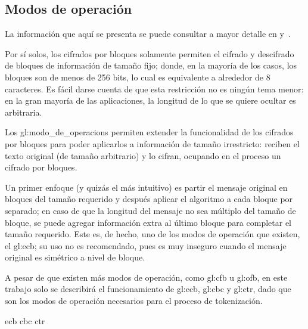 %
%

\subsection{Modos de operación}
\label{sec:modos}

La información que aquí se presenta se puede consultar a mayor detalle en
\cite{modos_de_operacion} y~\cite{menezes}.

Por sí solos, los cifrados por bloques solamente permiten el cifrado y
descifrado de bloques de información de tamaño fijo; donde, en la mayoría de
los casos, los bloques son de menos de 256 bits, lo cual es equivalente a
alrededor de 8 caracteres. Es fácil darse cuenta de que esta restricción no es
ningún tema menor: en la gran mayoría de las aplicaciones, la longitud de lo
que se quiere ocultar es arbitraria.

Los \glspl{gl:modo_de_operacion} permiten extender la funcionalidad de los
cifrados por bloques para poder aplicarlos a información de tamaño irrestricto:
reciben el texto original (de tamaño arbitrario) y lo cifran, ocupando en el
proceso un cifrado por bloques.

Un primer enfoque (y quizás el más intuitivo) es partir el mensaje original
en bloques del tamaño requerido y después aplicar el algoritmo a cada bloque
por separado; en caso de que la longitud del mensaje no sea múltiplo del
tamaño de bloque, se puede agregar información extra al último bloque para
completar el tamaño requerido. Este es, de hecho, uno de los modos de operación
que existen, el \gls{gl:ecb}; su uso no es recomendado, pues es muy inseguro
cuando el mensaje original es simétrico a nivel de bloque.

A pesar de que existen más modos de operación, como \gls{gl:cfb}
u \gls{gl:ofb}, en este trabajo solo se describirá el funcionamiento de
\gls{gl:ecb}, \gls{gl:cbc} y \gls{gl:ctr}, dado que son los modos de operación
necesarios para el proceso de tokenización.


{ecb}
{cbc}
{ctr}
